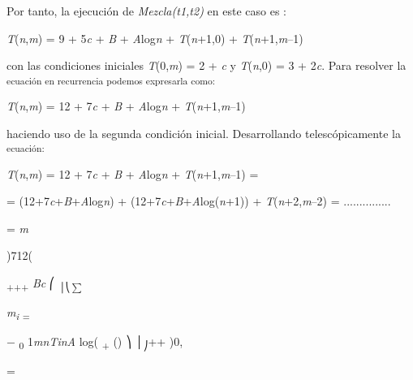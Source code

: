 \documentclass[12pt]{article}
\renewcommand{\_}{\kern-1.5pt\textunderscore\kern-1.5pt}
\begin{document}
{\fontsize{10pt}{12.0pt}\selectfont Por tanto, la ejecución de \textit{Mezcla(t1,t2) }en este caso es : \par}\par

{\fontsize{10pt}{12.0pt}\selectfont \textit{T}(\textit{n},\textit{m}) = 9 + 5\textit{c }+ \textit{B }+ \textit{A}log\textit{n }+ \textit{T}(\textit{n}+1,0) + \textit{T}(\textit{n}+1,\textit{m}–1) \par}\par

{\fontsize{10pt}{12.0pt}\selectfont con las condiciones iniciales \textit{T}(0,\textit{m}) = 2 + \textit{c }y \textit{T}(\textit{n},0) = 3 + 2\textit{c}. Para resolver la \textsubscript{ecuación en recurrencia podemos expresarla como: }\par}\par

{\fontsize{10pt}{12.0pt}\selectfont \textit{T}(\textit{n},\textit{m}) = 12 + 7\textit{c }+ \textit{B }+ \textit{A}log\textit{n }+ \textit{T}(\textit{n}+1,\textit{m}–1) \par}\par

{\fontsize{10pt}{12.0pt}\selectfont haciendo uso de la segunda condición inicial. Desarrollando telescópicamente la \textsubscript{ecuación: }\par}\par

{\fontsize{10pt}{12.0pt}\selectfont \textit{T}(\textit{n},\textit{m}) = 12 + 7\textit{c }+ \textit{B }+ \textit{A}log\textit{n }+ \textit{T}(\textit{n}+1,\textit{m}–1) = \par}\par

{\fontsize{10pt}{12.0pt}\selectfont = (12+7\textit{c}+\textit{B}+\textit{A}log\textit{n}) + (12+7\textit{c}+\textit{B}+\textit{A}log(\textit{n}+1)) + \textit{T}(\textit{n}+2,\textit{m}–2) = ............... \par}\par

{\fontsize{10pt}{12.0pt}\selectfont = \textit{m }\par}\par

)712( \par

\textsubscript{+++ }\textit{Bc }⎛ \textsubscript{│⎝$ \sum $ }{\fontsize{7pt}{8.4pt}\selectfont \textit{m\textsubscript{i }}\textsubscript{= }{\fontsize{6pt}{7.2pt}\selectfont $-$ \textsubscript{0 }1\textit{mnTinA }log( \textsubscript{+ }() ⎞ │\textsubscript{⎠}++ )0, {\fontsize{10pt}{12.0pt}\selectfont = \par}\par}\par}\par
\end{document}
